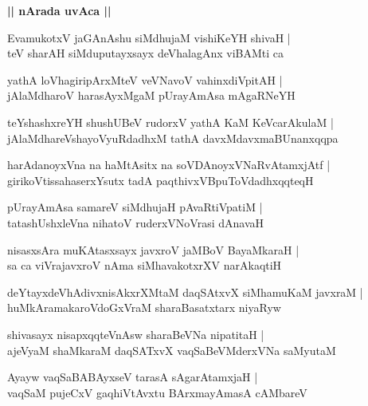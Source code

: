 \documentclass[twoside,12pt,openright]{book}
\newcounter{shloka}[chapter]
\def\uvaca#1{\centerline{{\large\textbf{#1}}}}
\begin{document}
\uvaca{|| nArada uvAca ||}

\begin{shloka}%
EvamukotxV jaGAnAshu siMdhujaM vishiKeYH shivaH |\\
teV sharAH siMduputayxsayx deVhalagAnx viBAMti ca 
\end{shloka}

\begin{shloka}%
yathA loVhagiripArxMteV veVNavoV vahinxdiVpitAH |\\
jAlaMdharoV harasAyxMgaM pUrayAmAsa mAgaRNeYH 
\end{shloka}

\begin{shloka}%
teYshashxreYH shushUBeV rudorxV yathA KaM KeVcarAkulaM |\\
jAlaMdhareVshayoVyuRdadhxM tathA davxMdavxmaBUnanxqqpa 
\end{shloka}

\begin{shloka}%
harAdanoyxVna na haMtAsitx na soVDAnoyxVNaRvAtamxjAtf |\\
girikoVtissahaserxYsutx tadA paqthivxVBpuToVdadhxqqteqH
\end{shloka}

\begin{shloka}%
pUrayAmAsa samareV siMdhujaH pAvaRtiVpatiM |\\
tatashUshxleVna nihatoV ruderxVNoVrasi dAnavaH 
\end{shloka}

\begin{shloka}%
nisasxsAra muKAtasxsayx javxroV jaMBoV BayaMkaraH |\\
sa ca viVrajavxroV nAma siMhavakotxrXV narAkaqtiH 
\end{shloka}

\begin{shloka}%
deYtayxdeVhAdivxnisAkxrXMtaM daqSAtxvX siMhamuKaM javxraM |\\
huMkAramakaroVdoGxVraM sharaBasatxtarx niyaRyw 
\end{shloka}

\begin{shloka}%
shivasayx nisapxqqteVnAsw sharaBeVNa nipatitaH |\\
ajeVyaM shaMkaraM daqSATxvX vaqSaBeVMderxVNa saMyutaM 
\end{shloka}

\begin{shloka}%
Ayayw vaqSaBABAyxseV tarasA sAgarAtamxjaH |\\
vaqSaM pujeCxV gaqhiVtAvxtu BArxmayAmasA cAMbareV 
\end{shloka}
\end{document}
